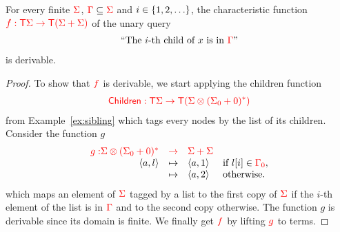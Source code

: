 \begin{lemma}\label{lem:nextmod}
  For every finite ${\color{red}{\Sigma}}$, ${\color{red}{\Gamma}}\subseteq {\color{red}{\Sigma}}$ and $i \in \{1,2,\ldots\}$, the characteristic function ${\color{red}{f:{\color{red}{\mathsf T}}{\color{red}{\Sigma}}\to{\color{red}{\mathsf T}}({\color{red}{\Sigma}}+{\color{red}{\Sigma}})}}$ of the  unary query 
        \begin{align*}
\text{``The }i\text{-th child of }x\text{ is in }{\color{red}{\Gamma}}\text{''}
        \end{align*}
        is derivable.
\end{lemma}
\begin{proof}
To show that ${\color{red}{f}}$ is derivable, we start applying the children function \begin{align*}
{\color{red}{\mathsf{Children}:{\color{red}{\mathsf T}}{\color{red}{\Sigma}}\to {\color{red}{\mathsf T}}({\color{red}{\Sigma}}\otimes ({\color{red}{\Sigma}}_0+0)^*)}}
\end{align*} from Example~\ref{ex:sibling} which tags every nodes by the list of its children. Consider the function $g$
$$\begin{array}{rlll}
{\color{red}{g:}}  {\color{red}{{\color{red}{\Sigma}}\otimes ({\color{red}{\Sigma}}_0+0)^*}} &{\color{red}{\to}}& {\color{red}{\Sigma +\Sigma}}&\\
            \langle{a,l}\rangle                           &
     \mapsto& \langle{a,1}\rangle              &\text{if } l[i]\in{\color{red}{{\color{red}{\Gamma}}_0}}, \\
                    &   \mapsto& \langle{a,2}\rangle &\text{otherwise.}   
\end{array}$$
which maps an element of ${\color{red}{\Sigma}}$ tagged by a list to the first copy of ${\color{red}{\Sigma}}$ if the $i$-th element of the list is in ${\color{red}{\Gamma}}$ and to the second copy otherwise. The function $g$ is derivable since its domain is finite.
We finally get ${\color{red}{f}}$ by lifting ${\color{red}{g}}$ to terms.
\end{proof}

